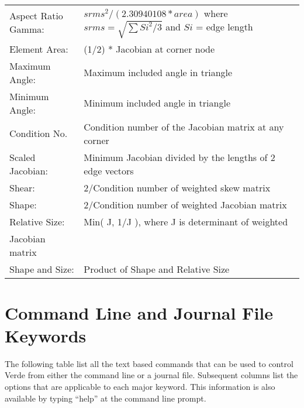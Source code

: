 \documentclass[10pt]{report}
\begin{document}
\begin{appendix}
\begin{tabular}{lp{4in}}
Aspect Ratio Gamma:  & $srms^2/(2.30940108*area)$ where $srms = \sqrt{\sum{Si^2}/3}$ and $Si$ = edge length \\
Element Area:        & (1/2) * Jacobian at corner node \\
Maximum Angle:       & Maximum included angle in triangle \\
Minimum Angle:       & Minimum included angle in triangle \\
Condition No.        & Condition number of the Jacobian matrix at any corner \\
Scaled Jacobian:     & Minimum Jacobian divided by the lengths of 2 edge vectors \\
Shear:               & 2/Condition number of weighted skew matrix \\
Shape:               & 2/Condition number of weighted Jacobian matrix \\
Relative Size:       & Min( J, 1/J ), where J is determinant of weighted \\
Jacobian matrix      & \\
Shape and Size:      & Product of Shape and Relative Size \\
\end{tabular}

\chapter{Command Line and Journal File Keywords}

The following table list all the text based commands that can
be used to control Verde from either the command line or a
journal file.  
Subsequent columns list the options that are applicable
to each major keyword.  
This information is also available by typing ``help'' at
the command line prompt.


\end{appendix}
\end{document}
